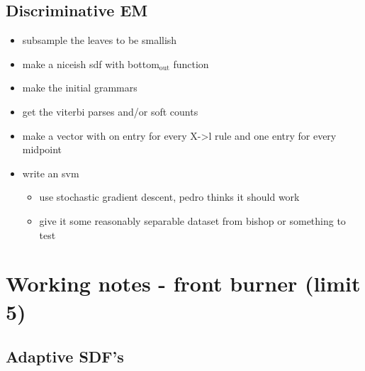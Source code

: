 \documentclass{book}
\begin{document}
\section{Discriminative EM}
\label{sec-4_3}

\begin{itemize}
\item subsample the leaves to be smallish
\item make a niceish sdf with bottom$_{\mathrm{out}}$ function
\item make the initial grammars
\item get the viterbi parses and/or soft counts
\item make a vector with on entry for every X->l rule and one entry for every midpoint
\item write an svm

\begin{itemize}
\item use stochastic gradient descent, pedro thinks it should work
\item give it some reasonably separable dataset from bishop or something to test
\end{itemize}

\end{itemize}
\chapter{Working notes - front burner (limit 5)}
\label{sec-5}
\section{Adaptive SDF's}
\label{sec-5_1}
\end{document}

